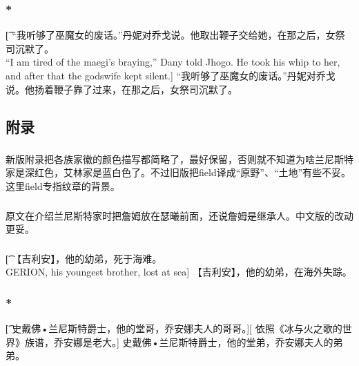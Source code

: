 \documentclass[12pt,a4paper]{article}
\newcommand{\h}[1]{{\color{red}#1}\\}
\begin{document}
\subsubsection{\color{red}*}\t[
	“我听够了巫魔女的废话。”丹妮对乔戈说。他取出鞭子交给她，在那之后，女祭司沉默了。\\
	“I am tired of the maegi's braying,” Dany told Jhogo. He took his whip to her, and after that the godswife kept silent.]
	“我听够了巫魔女的废话。”丹妮对乔戈说。他扬着鞭子靠了过来，在那之后，女祭司沉默了。
	
\subsection{附录}
\subsubsection{}\h{
	新版附录把各族家徽的颜色描写都简略了，最好保留，否则就不知道为啥兰尼斯特家是深红色，艾林家是蓝白色了。不过旧版把field译成“原野”、“土地”有些不妥。这里field专指纹章的背景。}
\subsubsection{}\h{原文在介绍兰尼斯特家时把詹姆放在瑟曦前面，还说詹姆是继承人。中文版的改动更妥。}

\subsubsection{}\t[
	【吉利安】，他的幼弟，死于海难。\\
	{GERION}, his youngest brother, lost at sea]
	【吉利安】，他的幼弟，在海外失踪。
	
\subsubsection{\color{red}*}\t[
	史戴佛•兰尼斯特爵士，他的堂哥，乔安娜夫人的哥哥。][
	依照《冰与火之歌的世界》族谱，乔安娜是老大。]
	史戴佛•兰尼斯特爵士，他的堂弟，乔安娜夫人的弟弟。
	
\end{document}
